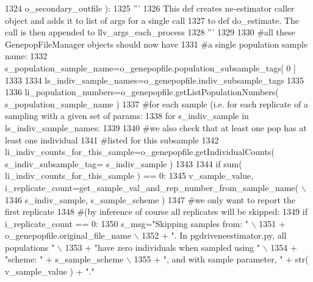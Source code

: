 \begin{DoxyCode}
1324                         o\_secondary\_outfile ):
1325     \textcolor{stringliteral}{'''     }
1326 \textcolor{stringliteral}{    This def creates ne-estimator caller object and adds it to list of args for a single call}
1327 \textcolor{stringliteral}{    to def do\_estimate.  The call is then appended to llv\_args\_each\_process}
1328 \textcolor{stringliteral}{    '''}
1329 
1330     \textcolor{comment}{#all these GenepopFileManager objects should now have}
1331     \textcolor{comment}{#a single population sample name:}
1332     s\_population\_sample\_name=o\_genepopfile.population\_subsample\_tags[ 0 ]
1333 
1334     ls\_indiv\_sample\_names=o\_genepopfile.indiv\_subsample\_tags
1335 
1336     li\_population\_numbers=o\_genepopfile.getListPopulationNumbers( s\_population\_sample\_name )
1337     \textcolor{comment}{#for each sample (i.e. for each replicate of a sampling with a given set of params:}
1338     \textcolor{keywordflow}{for} s\_indiv\_sample \textcolor{keywordflow}{in} ls\_indiv\_sample\_names:
1339 
1340         \textcolor{comment}{#we also check that at least one pop has at least one individual}
1341         \textcolor{comment}{#listed for this subsample}
1342         li\_indiv\_counts\_for\_this\_sample=o\_genepopfile.getIndividualCounts( s\_indiv\_subsample\_tag=
      s\_indiv\_sample )
1343     
1344         \textcolor{keywordflow}{if} sum( li\_indiv\_counts\_for\_this\_sample ) == 0:
1345             v\_sample\_value, i\_replicate\_count=get\_sample\_val\_and\_rep\_number\_from\_sample\_name( \(\backslash\)
1346                                             s\_indiv\_sample, s\_sample\_scheme )
1347             \textcolor{comment}{#we only want to report the first replicate}
1348             \textcolor{comment}{#(by inference of course all replicates will be skipped:}
1349             \textcolor{keywordflow}{if} i\_replicate\_count == 0:
1350                 s\_msg=\textcolor{stringliteral}{"Skipping samples from: "} \(\backslash\)
1351                         + o\_genepopfile.original\_file\_name \(\backslash\)
1352                         + \textcolor{stringliteral}{".  In pgdriveneestimator.py, all populations "} \(\backslash\)
1353                         + \textcolor{stringliteral}{"have zero individuals when sampled using "} \(\backslash\)
1354                         + \textcolor{stringliteral}{"scheme: "} + s\_sample\_scheme \(\backslash\)
1355                         + \textcolor{stringliteral}{", and with sample parameter, "} + str( v\_sample\_value ) + \textcolor{stringliteral}{"."}

\end{DoxyCode}
